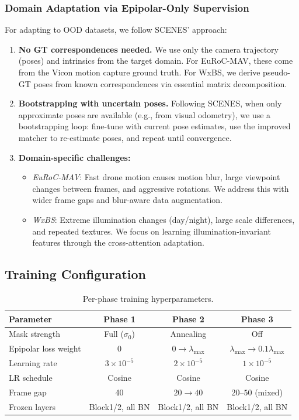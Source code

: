 \documentclass[11pt,a4paper]{article}
\begin{document}
\subsubsection{Domain Adaptation via Epipolar-Only Supervision}

For adapting to OOD datasets, we follow SCENES' approach:

\begin{enumerate}[leftmargin=*]
    \item \textbf{No GT correspondences needed.} We use only the camera trajectory (poses) and intrinsics from the target domain. For EuRoC-MAV, these come from the Vicon motion capture ground truth. For WxBS, we derive pseudo-GT poses from known correspondences via essential matrix decomposition.

    \item \textbf{Bootstrapping with uncertain poses.} Following SCENES, when only approximate poses are available (e.g., from visual odometry), we use a bootstrapping loop: fine-tune with current pose estimates, use the improved matcher to re-estimate poses, and repeat until convergence.

    \item \textbf{Domain-specific challenges:}
    \begin{itemize}
        \item \textit{EuRoC-MAV}: Fast drone motion causes motion blur, large viewpoint changes between frames, and aggressive rotations. We address this with wider frame gaps and blur-aware data augmentation.
        \item \textit{WxBS}: Extreme illumination changes (day/night), large scale differences, and repeated textures. We focus on learning illumination-invariant features through the cross-attention adaptation.
    \end{itemize}
\end{enumerate}

\subsection{Training Configuration}

\begin{table}[h]
\centering
\caption{Per-phase training hyperparameters.}
\begin{tabular}{lccc}
\toprule
\textbf{Parameter} & \textbf{Phase 1} & \textbf{Phase 2} & \textbf{Phase 3} \\
\midrule
Mask strength & Full ($\sigma_0$) & Annealing & Off \\
Epipolar loss weight & 0 & $0 \to \lambda_{\max}$ & $\lambda_{\max} \to 0.1\lambda_{\max}$ \\
Learning rate & $3\!\times\!10^{-5}$ & $2\!\times\!10^{-5}$ & $1\!\times\!10^{-5}$ \\
LR schedule & Cosine & Cosine & Cosine \\
Frame gap & 40 & $20 \to 40$ & $20$--$50$ (mixed) \\
Frozen layers & Block1/2, all BN & Block1/2, all BN & Block1/2, all BN \\
\bottomrule
\end{tabular}
\end{table}
\end{document}
